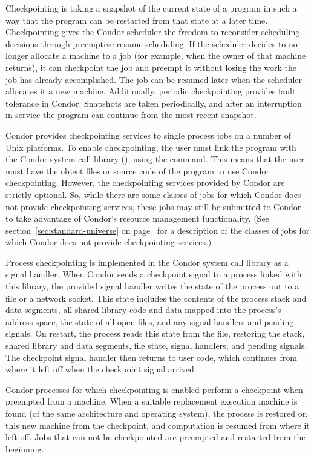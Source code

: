 Checkpointing is taking a snapshot of the current state of a program
in such a way that the program can be restarted from that state at a
later time.  Checkpointing gives the Condor scheduler the freedom to
reconsider scheduling decisions through preemptive-resume scheduling.
If the scheduler decides to no longer allocate a machine to a job (for
example, when the owner of that machine returns), it can checkpoint
the job and preempt it without losing the work the job has already
accomplished.  The job can be resumed later when the scheduler
allocates it a new machine.  Additionally, periodic checkpointing
provides fault tolerance in Condor.  Snapshots are taken periodically,
and after an interruption in service the program can continue from the
most recent snapshot.

Condor provides checkpointing services to single process jobs on a
number of Unix platforms.  To enable checkpointing, the user must link
the program with the Condor system call library
(), using the
 command.  This means that the
user must have the object files or source code of the program to use
Condor checkpointing.  However, the checkpointing services provided by
Condor are strictly optional.  So, while there are some classes of
jobs for which Condor does not provide checkpointing services, these
jobs may still be submitted to Condor to take advantage of Condor's
resource management functionality.  (See
section~\ref{sec:standard-universe} on
page~\pageref{sec:standard-universe} for a description of the
classes of jobs for which Condor does not provide checkpointing
services.)

Process checkpointing is implemented in the Condor system call library
as a signal handler.  When Condor sends a checkpoint signal to a
process linked with this library, the provided signal handler writes
the state of the process out to a file or a network socket.  This
state includes the contents of the process stack and data segments,
all shared library code and data mapped into the process's address
space, the state of all open files, and any signal handlers and
pending signals.  On restart, the process reads this state from the
file, restoring the stack, shared library and data segments, file
state, signal handlers, and pending signals.  The checkpoint signal
handler then returns to user code, which continues from where it left
off when the checkpoint signal arrived.

Condor processes for which checkpointing is enabled perform a
checkpoint when preempted from a machine.  When a suitable replacement
execution machine is found (of the same architecture and operating
system), the process is restored on this new machine from the
checkpoint, and computation is resumed from where it left off.  Jobs
that can not be checkpointed are preempted and restarted from the
beginning.

